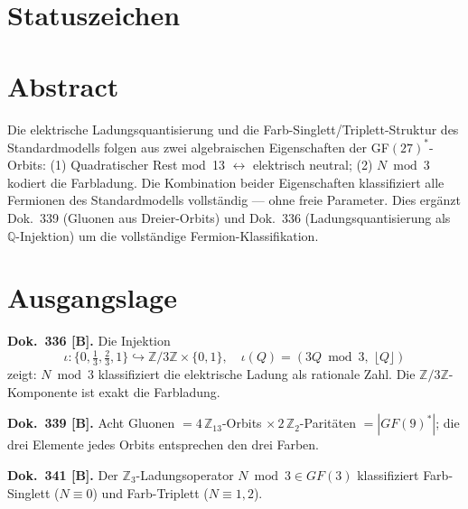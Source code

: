 
\providecommand{\BM}{\textbf{[B]}}
\providecommand{\KM}{\textbf{[K]}}
\providecommand{\SM}{\textbf{[S]}}
\providecommand{\LM}{\textbf{[L]}}
\providecommand{\SetzM}{\textbf{[SETZUNG]}}

{}

\section*{Statuszeichen}


\section*{Abstract}

Die elektrische Ladungsquantisierung und die Farb-Singlett/Triplett-Struktur
des Standardmodells folgen aus zwei algebraischen Eigenschaften der
GF$(27)^*$-Orbits: (1) Quadratischer Rest mod~13 $\leftrightarrow$ elektrisch
neutral; (2) $N \bmod 3$ kodiert die Farbladung. Die Kombination beider
Eigenschaften klassifiziert alle Fermionen des Standardmodells vollständig ---
ohne freie Parameter. Dies ergänzt Dok.~339 (Gluonen aus Dreier-Orbits) und
Dok.~336 (Ladungsquantisierung als $\mathbb{Q}$-Injektion) um die vollständige
Fermion-Klassifikation.

\section{Ausgangslage}

\textbf{Dok.~336 \BM.} Die Injektion
\[
  \iota: \{0,\tfrac{1}{3},\tfrac{2}{3},1\} \hookrightarrow
  \mathbb{Z}/3\mathbb{Z}\times\{0,1\},\quad
  \iota(Q) = (3Q\bmod 3,\;\lfloor Q\rfloor)
\]
zeigt: $N \bmod 3$ klassifiziert die elektrische Ladung als rationale Zahl.
Die $\mathbb{Z}/3\mathbb{Z}$-Komponente ist exakt die Farbladung.

\textbf{Dok.~339 \BM.} Acht Gluonen $= 4\,\mathbb{Z}_{13}$-Orbits
$\times\,2\,\mathbb{Z}_2$-Paritäten $= |GF(9)^*|$; die drei Elemente
jedes Orbits entsprechen den drei Farben.

\textbf{Dok.~341 \BM.} Der $\mathbb{Z}_3$-Ladungsoperator $N \bmod 3 \in GF(3)$
klassifiziert Farb-Singlett ($N\equiv0$) und Farb-Triplett ($N\equiv1,2$).


